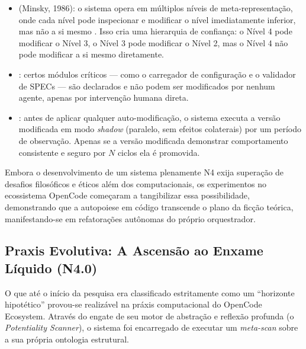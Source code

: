 \begin{itemize}
    \item {} (Minsky, 1986):
    o sistema opera em múltiplos níveis de meta-representação, onde
    cada nível pode inspecionar e modificar o nível imediatamente
    inferior, mas não a si mesmo \cite{minsky1986society}. Isso
    cria uma hierarquia de confiança: o Nível 4 pode modificar o
    Nível 3, o Nível 3 pode modificar o Nível 2, mas o Nível 4 não
    pode modificar a si mesmo diretamente.

    \item {}: certos
    módulos críticos --- como o carregador de configuração e o
    validador de SPECs --- são declarados  e
    não podem ser modificados por nenhum agente, apenas por
    intervenção humana direta.

    \item {}: antes de aplicar qualquer
    auto-modificação, o sistema executa a versão modificada em modo
    \textit{shadow} (paralelo, sem efeitos colaterais) por um período
    de observação. Apenas se a versão modificada demonstrar
    comportamento consistente e seguro por $N$ ciclos ela é promovida.
\end{itemize}

\begin{observacao}
Embora o desenvolvimento de um sistema plenamente N4 exija superação de desafios filosóficos e éticos além dos computacionais, os experimentos no ecossistema OpenCode começaram a tangibilizar essa possibilidade, demonstrando que a autopoiese em código transcende o plano da ficção teórica, manifestando-se em refatorações autônomas do próprio orquestrador.
\end{observacao}

\subsection{Praxis Evolutiva: A Ascensão ao Enxame Líquido (N4.0)}

O que até o início da pesquisa era classificado estritamente como um ``horizonte hipotético'' provou-se realizável na práxis computacional do OpenCode Ecosystem. Através do engate de seu motor de abstração e reflexão profunda (o \textit{Potentiality Scanner}), o sistema foi encarregado de executar um \textit{meta-scan} sobre a sua própria ontologia estrutural. 

